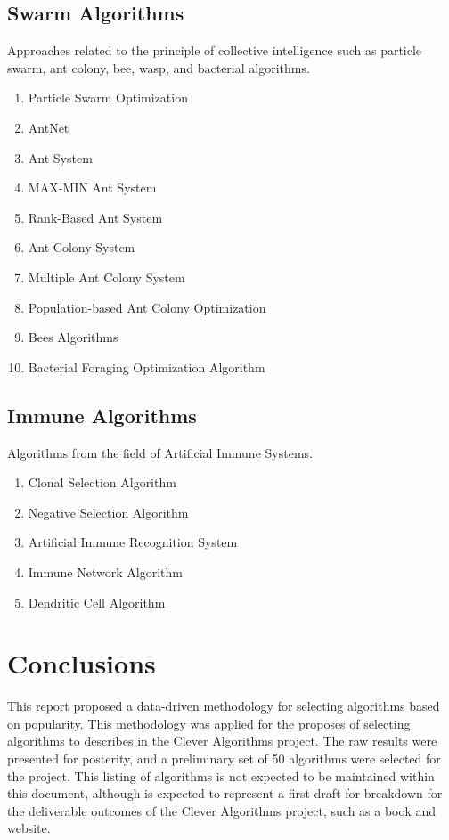\documentclass[a4paper, 11pt]{article}
\begin{document}
\subsection{Swarm Algorithms}
Approaches related to the principle of collective intelligence such as particle swarm, ant colony, bee, wasp, and bacterial algorithms. 

\begin{enumerate}
	\item Particle Swarm Optimization
	\item AntNet
	\item Ant System
	\item MAX-MIN Ant System
	\item Rank-Based Ant System
	\item Ant Colony System
	\item Multiple Ant Colony System
	\item Population-based Ant Colony Optimization
	\item Bees Algorithms
	\item Bacterial Foraging Optimization Algorithm
\end{enumerate}

\subsection{Immune Algorithms}
Algorithms from the field of Artificial Immune Systems.

\begin{enumerate}
	\item Clonal Selection Algorithm
	\item Negative Selection Algorithm
	\item Artificial Immune Recognition System
	\item Immune Network Algorithm
	\item Dendritic Cell Algorithm
\end{enumerate}

% 
% 
\section{Conclusions}
\label{sec:conclusions}
This report proposed a data-driven methodology for selecting algorithms based on popularity. This methodology was applied for the proposes of selecting algorithms to describes in the Clever Algorithms project. The raw results were presented for posterity, and a preliminary set of 50 algorithms were selected for the project. This listing of algorithms is not expected to be maintained within this document, although is expected to represent a first draft for breakdown for the deliverable outcomes of the Clever Algorithms project, such as a book and website. 
\end{document}
